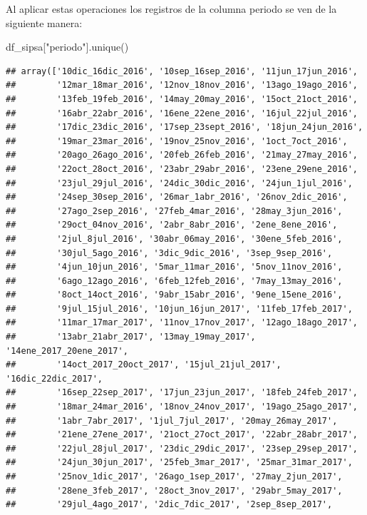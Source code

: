 \documentclass[
]{book}
\newenvironment{Shaded}{\begin{snugshade}}{\end{snugshade}}
\newcommand{\NormalTok}[1]{#1}
\newcommand{\StringTok}[1]{\textcolor[rgb]{0.31,0.60,0.02}{#1}}
\begin{document}
Al aplicar estas operaciones los registros de la columna periodo se ven de la siguiente manera:

\begin{Shaded}
\begin{Highlighting}[]

\NormalTok{df\_sipsa[}\StringTok{"periodo"}\NormalTok{].unique()}
\end{Highlighting}
\end{Shaded}

\begin{verbatim}
## array(['10dic_16dic_2016', '10sep_16sep_2016', '11jun_17jun_2016',
##        '12mar_18mar_2016', '12nov_18nov_2016', '13ago_19ago_2016',
##        '13feb_19feb_2016', '14may_20may_2016', '15oct_21oct_2016',
##        '16abr_22abr_2016', '16ene_22ene_2016', '16jul_22jul_2016',
##        '17dic_23dic_2016', '17sep_23sept_2016', '18jun_24jun_2016',
##        '19mar_23mar_2016', '19nov_25nov_2016', '1oct_7oct_2016',
##        '20ago_26ago_2016', '20feb_26feb_2016', '21may_27may_2016',
##        '22oct_28oct_2016', '23abr_29abr_2016', '23ene_29ene_2016',
##        '23jul_29jul_2016', '24dic_30dic_2016', '24jun_1jul_2016',
##        '24sep_30sep_2016', '26mar_1abr_2016', '26nov_2dic_2016',
##        '27ago_2sep_2016', '27feb_4mar_2016', '28may_3jun_2016',
##        '29oct_04nov_2016', '2abr_8abr_2016', '2ene_8ene_2016',
##        '2jul_8jul_2016', '30abr_06may_2016', '30ene_5feb_2016',
##        '30jul_5ago_2016', '3dic_9dic_2016', '3sep_9sep_2016',
##        '4jun_10jun_2016', '5mar_11mar_2016', '5nov_11nov_2016',
##        '6ago_12ago_2016', '6feb_12feb_2016', '7may_13may_2016',
##        '8oct_14oct_2016', '9abr_15abr_2016', '9ene_15ene_2016',
##        '9jul_15jul_2016', '10jun_16jun_2017', '11feb_17feb_2017',
##        '11mar_17mar_2017', '11nov_17nov_2017', '12ago_18ago_2017',
##        '13abr_21abr_2017', '13may_19may_2017', '14ene_2017_20ene_2017',
##        '14oct_2017_20oct_2017', '15jul_21jul_2017', '16dic_22dic_2017',
##        '16sep_22sep_2017', '17jun_23jun_2017', '18feb_24feb_2017',
##        '18mar_24mar_2016', '18nov_24nov_2017', '19ago_25ago_2017',
##        '1abr_7abr_2017', '1jul_7jul_2017', '20may_26may_2017',
##        '21ene_27ene_2017', '21oct_27oct_2017', '22abr_28abr_2017',
##        '22jul_28jul_2017', '23dic_29dic_2017', '23sep_29sep_2017',
##        '24jun_30jun_2017', '25feb_3mar_2017', '25mar_31mar_2017',
##        '25nov_1dic_2017', '26ago_1sep_2017', '27may_2jun_2017',
##        '28ene_3feb_2017', '28oct_3nov_2017', '29abr_5may_2017',
##        '29jul_4ago_2017', '2dic_7dic_2017', '2sep_8sep_2017',

\end{verbatim}
\end{document}
